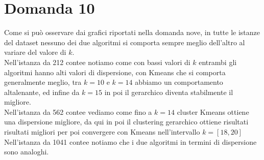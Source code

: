 \documentclass{article}
\begin{document}
\section*{Domanda 10}
Come si può osservare dai grafici riportati nella domanda nove, in tutte le istanze del dataset nessuno dei due algoritmi si comporta sempre meglio dell'altro al variare del valore di $k$.\\
Nell'istanza da 212 contee notiamo come con bassi valori di $k$ entrambi gli algoritmi hanno alti valori di dispersione, con Kmeans che si comporta generalmente meglio, tra $k=10$ e $k=14$ abbiamo un comportamento altalenante, ed infine da $k=15$ in poi il gerarchico diventa stabilmente il migliore.\\
Nell'istanza da 562 contee vediamo come fino a $k=14$ cluster Kmeans ottiene una dispersione migliore, da qui in poi il clustering gerarchico ottiene risultati risultati migliori per poi convergere con Kmeans nell'intervallo $k=[18,20]$ \\
Nell'istanza da 1041 contee notiamo che i due algoritmi in termini di dispersione sono analoghi.
\end{document}
